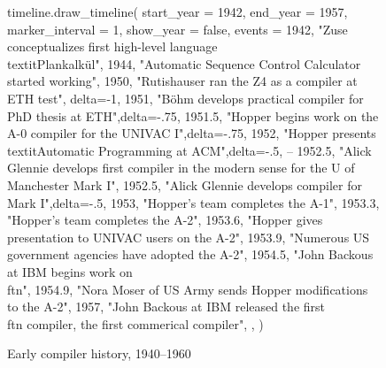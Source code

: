 \pagebreak
\begin{figure}[h]
\begin{luacode}
timeline.draw_timeline({ 
    start_year = 1942,
    end_year = 1957,
    marker_interval = 1,
    show_year = false,
    events = {
        {1942, "Zuse conceptualizes first high-level language \\textit{Plankalkül}"},
        {1944, "Automatic Sequence Control Calculator started working"},
        {1950, "Rutishauser ran the Z4 as a compiler at ETH test", delta=-1},
        {1951, "B{\"o}hm develops practical compiler for PhD thesis at ETH",delta=-.75},
        {1951.5, "Hopper begins work on the A-0 compiler for the UNIVAC I",delta=-.75},
        {1952, "Hopper presents \\textit{Automatic Programming} at ACM",delta=-.5},
        -- {1952.5, "Alick Glennie develops first compiler in the modern sense for the U of Manchester Mark I"},
        {1952.5, "Alick Glennie develops compiler for Mark I",delta=-.5},
        {1953, "Hopper's team completes the A-1"},
        {1953.3, "Hopper's team completes the A-2"},
        {1953.6, "Hopper gives presentation to UNIVAC users on the A-2"},
        {1953.9, "Numerous US government agencies have adopted the A-2"},
        {1954.5, "John Backous at IBM begins work on \\ftn{}"},
        {1954.9, "Nora Moser of US Army sends Hopper modifications to the A-2"},
        {1957, "John Backous at IBM released the first \\ftn{} compiler, the first commerical compiler"},
    },
})
\end{luacode}
\caption{Early compiler history, 1940--1960}
\label{fig:dawn-timeline}
\end{figure}
